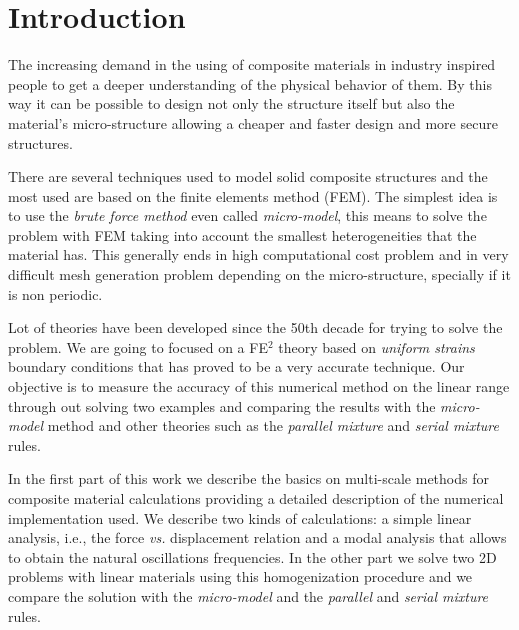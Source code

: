 \documentclass[preprint]{elsarticle}
\begin{document}
\linenumbers

\section{Introduction}

The increasing demand in the using of composite materials in industry inspired people
to get a deeper understanding of the physical behavior of them. By this way it
can be possible to design not only the structure itself but also the material's
micro-structure allowing a cheaper and faster design and more secure structures.

There are several techniques used to model solid composite structures and the
most used are based on the finite elements method (FEM).
The simplest idea is to use the \emph{brute force method}
even called \emph{micro-model}, this means to solve the problem with FEM
taking into account the smallest heterogeneities that the material has.
This generally ends in high computational cost problem and in very difficult mesh
generation problem depending on the micro-structure, specially if it is non
periodic.

Lot of theories have been developed since the 50th decade for trying to solve
the problem. We are going to focused on a FE$^2$ theory based on
\emph{uniform strains} boundary conditions that has proved to be a very accurate technique.
Our objective is to measure the accuracy of this numerical method on the linear 
range through out solving two examples and comparing the results with the 
\emph{micro-model} method and other theories such as the \emph{parallel mixture} 
and \emph{serial mixture} rules. 

In the first part of this work we describe the basics on multi-scale methods
for composite material calculations providing a detailed description of the
numerical implementation used. We describe two kinds of calculations: a simple
linear analysis, i.e., the force \emph{vs.} displacement relation
and a modal analysis that allows to obtain the natural oscillations
frequencies.
In the other part we solve two 2D problems with linear materials using this 
homogenization procedure and we compare the solution with the \emph{micro-model} 
and the \emph{parallel} and \emph{serial mixture} rules. 

\end{document}
